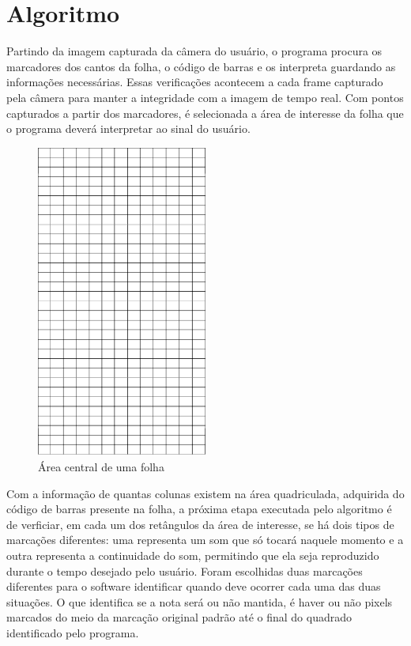 \documentclass[12pt]{report}
\begin{document}
\chapter{Algoritmo}
\label{cha:cha2}

Partindo da imagem capturada da câmera do usuário, o programa procura os marcadores dos cantos da folha, o código de barras e os interpreta guardando as informações necessárias. Essas verificações acontecem a cada frame capturado pela câmera para manter a integridade com a imagem de tempo real.
Com pontos capturados a partir dos marcadores, é selecionada a área de interesse da folha que o programa deverá interpretar ao sinal do usuário.

\begin{figure}[H]
  \centering
    \includegraphics[angle=90,origin=c,width=0.5\textwidth]{imagens/aoi.png}
    \caption{Área central de uma folha}
  \label{fig:aoi_aoi}
\end{figure}

Com a informação de quantas colunas existem na área quadriculada, adquirida do código de barras presente na folha, a próxima etapa executada pelo algoritmo é de verficiar, em cada um dos retângulos da área de interesse, se há dois tipos de marcações diferentes: uma representa um som que só tocará naquele momento e a outra representa a continuidade do som, permitindo que ela seja reproduzido durante o tempo desejado pelo usuário. Foram escolhidas duas marcações diferentes para o software identificar quando deve ocorrer cada uma das duas situações. O que identifica se a nota será ou não mantida, é haver ou não pixels marcados do meio da marcação original padrão até o final do quadrado identificado pelo programa.
\end{document}
